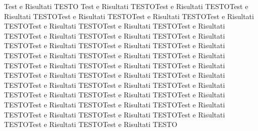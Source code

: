 \documentclass[12pt,a4paper,openright,twoside]{report}
\begin{document}
Test e Risultati TESTO\newline
Test e Risultati TESTO\newline Test e Risultati TESTO\newline Test e Risultati TESTO\newline Test e Risultati TESTO\newline Test e Risultati TESTO\newline Test e Risultati TESTO\newline Test e Risultati TESTO\newline Test e Risultati TESTO\newline Test e Risultati TESTO\newline Test e Risultati TESTO\newline Test e Risultati TESTO\newline Test e Risultati TESTO\newline Test e Risultati TESTO\newline Test e Risultati TESTO\newline Test e Risultati TESTO\newline Test e Risultati TESTO\newline Test e Risultati TESTO\newline Test e Risultati TESTO\newline Test e Risultati TESTO\newline Test e Risultati TESTO\newline Test e Risultati TESTO\newline Test e Risultati TESTO\newline Test e Risultati TESTO\newline Test e Risultati TESTO\newline Test e Risultati TESTO\newline Test e Risultati TESTO\newline Test e Risultati TESTO\newline Test e Risultati TESTO\newline Test e Risultati TESTO\newline Test e Risultati TESTO\newline Test e Risultati TESTO\newline Test e Risultati TESTO\newline Test e Risultati TESTO\newline Test e Risultati TESTO\newline Test e Risultati TESTO\newline Test e Risultati TESTO\newline Test e Risultati TESTO\newline Test e Risultati TESTO\newline 
\end{document}
